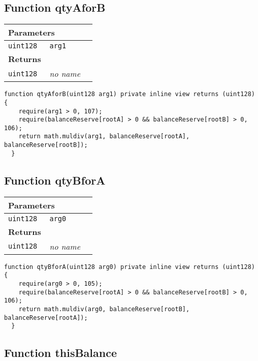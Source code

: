 \subsection{Function qtyAforB}


\ifsoltables
\noindent\begin{tabular}{|l|l|p{5cm}|}\hline
\multicolumn{3}{|l|}{\bf Parameters}\\\hline
\tt uint128 & \tt arg1 &\\\hline
\multicolumn{3}{|l|}{\bf Returns}\\\hline
\tt uint128 & {\em no name} &\\\hline
\end{tabular}
\fi

\vspace{2cm}

\begin{lstlisting}[firstnumber=184]
  function qtyAforB(uint128 arg1) private inline view returns (uint128) {
    require(arg1 > 0, 107);
    require(balanceReserve[rootA] > 0 && balanceReserve[rootB] > 0, 106);
    return math.muldiv(arg1, balanceReserve[rootA], balanceReserve[rootB]);
  }
\end{lstlisting}

\subsection{Function qtyBforA}


\ifsoltables
\noindent\begin{tabular}{|l|l|p{5cm}|}\hline
\multicolumn{3}{|l|}{\bf Parameters}\\\hline
\tt uint128 & \tt arg0 &\\\hline
\multicolumn{3}{|l|}{\bf Returns}\\\hline
\tt uint128 & {\em no name} &\\\hline
\end{tabular}
\fi

\vspace{2cm}

\begin{lstlisting}[firstnumber=177]
  function qtyBforA(uint128 arg0) private inline view returns (uint128) {
    require(arg0 > 0, 105);
    require(balanceReserve[rootA] > 0 && balanceReserve[rootB] > 0, 106);
    return math.muldiv(arg0, balanceReserve[rootB], balanceReserve[rootA]);
  }
\end{lstlisting}

\subsection{Function thisBalance}


